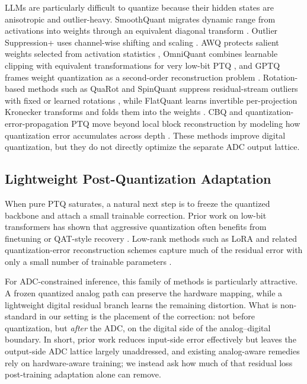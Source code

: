 \documentclass[letterpaper]{article} %
\theoremstyle{plain}
\begin{document}
    LLMs are particularly difficult to quantize because their hidden states are anisotropic and outlier-heavy. SmoothQuant migrates dynamic range from activations into weights through an equivalent diagonal transform \cite{xiao2022smoothquant}. Outlier Suppression+ uses channel-wise shifting and scaling \cite{wei2023outlier}. AWQ protects salient weights selected from activation statistics \cite{lin2023awq}, OmniQuant combines learnable clipping with equivalent transformations for very low-bit PTQ \cite{shao2023omniquant}, and GPTQ frames weight quantization as a second-order reconstruction problem \cite{frantar2022gptq}. Rotation-based methods such as QuaRot and SpinQuant suppress residual-stream outliers with fixed or learned rotations \cite{ashkboos2024quarot,liu2024spinquant}, while FlatQuant learns invertible per-projection Kronecker transforms and folds them into the weights \cite{liu2024flatquant}. CBQ and quantization-error-propagation PTQ move beyond local block reconstruction by modeling how quantization error accumulates across depth \cite{ding2023cbq,qep2025}. These methods improve digital quantization, but they do not directly optimize the separate ADC output lattice.
    
    \subsection{Lightweight Post-Quantization Adaptation}
    
    When pure PTQ saturates, a natural next step is to freeze the quantized backbone and attach a small trainable correction. Prior work on low-bit transformers has shown that aggressive quantization often benefits from finetuning or QAT-style recovery \cite{liu2023llmqat,chen2024efficientqat}. Low-rank methods such as LoRA and related quantization-error reconstruction schemes capture much of the residual error with only a small number of trainable parameters \cite{hu2022lora,zhang2024lqer}.
    
    For ADC-constrained inference, this family of methods is particularly attractive. A frozen quantized analog path can preserve the hardware mapping, while a lightweight digital residual branch learns the remaining distortion. What is non-standard in our setting is the placement of the correction: not before quantization, but \emph{after} the ADC, on the digital side of the analog--digital boundary. In short, prior work reduces input-side error effectively but leaves the output-side ADC lattice largely unaddressed, and existing analog-aware remedies rely on hardware-aware training; we instead ask how much of that residual loss post-training adaptation alone can remove.
\end{document}
